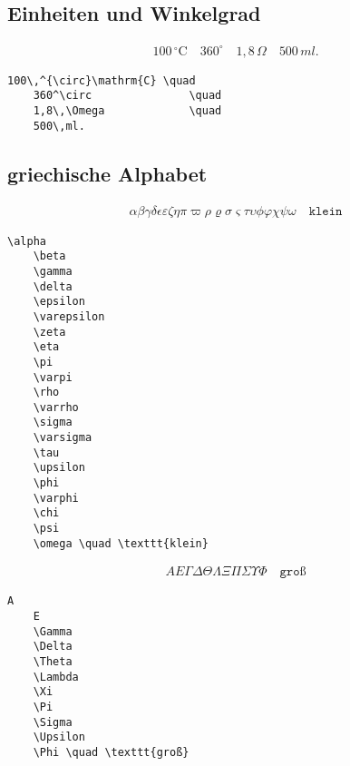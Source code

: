 \subsection{Einheiten und Winkelgrad}\label{einheiten }

\begin{align}
100\,^{\circ}\mathrm{C} \quad
360^\circ               \quad
1,8\,\Omega             \quad
500\,ml.
\end{align}

\lstset{language=[LaTeX]TeX } %
\begin{lstlisting}[gobble=2, frame=none, numbers=none, backgroundcolor=\color{white},%
	caption={},label={code:}]
	100\,^{\circ}\mathrm{C} \quad
	360^\circ               \quad
	1,8\,\Omega             \quad
	500\,ml.
\end{lstlisting}


\subsection{griechische Alphabet}\label{griechischeAlphabet }

\begin{align}
\alpha
\beta
\gamma
\delta
\epsilon
\varepsilon
\zeta
\eta
\pi
\varpi
\rho
\varrho
\sigma
\varsigma
\tau
\upsilon
\phi
\varphi
\chi
\psi
\omega \quad \texttt{klein}
\end{align}

\lstset{language=[LaTeX]TeX } %
\begin{lstlisting}[gobble=2, frame=none, numbers=none, backgroundcolor=\color{white},%
	caption={},label={code:}]
	\alpha
	\beta
	\gamma
	\delta
	\epsilon
	\varepsilon
	\zeta
	\eta
	\pi
	\varpi
	\rho
	\varrho
	\sigma
	\varsigma
	\tau
	\upsilon
	\phi
	\varphi
	\chi
	\psi
	\omega \quad \texttt{klein}
\end{lstlisting}


\begin{align}
A
E
\Gamma
\Delta
\Theta
\Lambda
\Xi
\Pi
\Sigma
\Upsilon
\Phi \quad \texttt{groß}
\end{align}

\lstset{language=[LaTeX]TeX } %
\begin{lstlisting}[gobble=2, frame=none, numbers=none, backgroundcolor=\color{white},%
	caption={},label={code:}]
	A
	E
	\Gamma
	\Delta
	\Theta
	\Lambda
	\Xi
	\Pi
	\Sigma
	\Upsilon
	\Phi \quad \texttt{groß}
\end{lstlisting}


